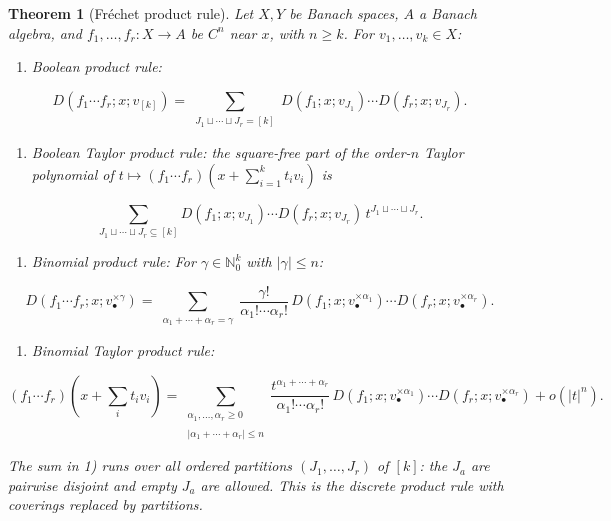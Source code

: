 \documentclass[10pt,a4paper]{article}
\theoremstyle{plain}
\newtheorem{theorem}{Theorem}
\theoremstyle{definition}
\newcommand{\IN}{\mathbb{N}} %
\newcommand{\1}{\mathbb{1}} %
\newcommand{\tightlist}{\setlength{\itemsep}{0pt}\setlength{\parskip}{0pt}}
\begin{document}
\begin{theorem}[Fréchet product rule]

\label{thm:frechet-product-rule} Let \(X, Y\) be Banach spaces, \(A\) a
Banach algebra, and \(f_1, \dots, f_r: X \to A\) be \(C^n\) near \(x\),
with \(n \geq k\). For \(v_1, \dots, v_k \in X\):

\begin{enumerate}
\def\labelenumi{\arabic{enumi})}
\tightlist
\item
  \emph{Boolean product rule:}
\end{enumerate}

\[
  D(f_1 \cdots f_r; x; v_{[k]})
  =
  \sum_{\substack{J_1 \sqcup \cdots \sqcup J_r = [k]}}
  D(f_1; x; v_{J_1}) \cdots D(f_r; x; v_{J_r}).
\]

\begin{enumerate}
\def\labelenumi{\arabic{enumi})}
\setcounter{enumi}{1}
\tightlist
\item
  \emph{Boolean Taylor product rule:} the square-free part of the
  order-\(n\) Taylor polynomial of
  \(t \mapsto (f_1 \cdots f_r)(x + \sum_{i=1}^k t_i v_i)\) is
\end{enumerate}

\[
  \sum_{J_1 \sqcup \cdots \sqcup J_r \subseteq [k]}
  D(f_1; x; v_{J_1}) \cdots D(f_r; x; v_{J_r})\, t^{J_1 \sqcup \cdots \sqcup J_r}.
\]

\begin{enumerate}
\def\labelenumi{\arabic{enumi})}
\setcounter{enumi}{2}
\tightlist
\item
  \emph{Binomial product rule:} For \(\gamma \in \IN_0^k\) with
  \(|\gamma| \leq n\):
\end{enumerate}

\[
  D(f_1 \cdots f_r; x; v_\bullet^{\times \gamma})
  =
  \sum_{\substack{\alpha_1 + \cdots + \alpha_r = \gamma}}
  \frac{\gamma!}{\alpha_1! \cdots \alpha_r!}\,
  D(f_1; x; v_\bullet^{\times \alpha_1}) \cdots D(f_r; x; v_\bullet^{\times \alpha_r}).
\]

\begin{enumerate}
\def\labelenumi{\arabic{enumi})}
\setcounter{enumi}{3}
\tightlist
\item
  \emph{Binomial Taylor product rule:}
\end{enumerate}

\[
  (f_1 \cdots f_r)(x + {\textstyle\sum_i} t_i v_i)
  =
  \sum_{\substack{\alpha_1, \dots, \alpha_r \geq 0 \\\\ |\alpha_1 + \cdots + \alpha_r| \leq n}}
  \frac{t^{\alpha_1 + \cdots + \alpha_r}}{\alpha_1! \cdots \alpha_r!}\,
  D(f_1; x; v_\bullet^{\times \alpha_1}) \cdots D(f_r; x; v_\bullet^{\times \alpha_r}) + o(|t|^n).
\]

The sum in 1) runs over all \emph{ordered partitions}
\((J_1, \dots, J_r)\) of \([k]\): the \(J_a\) are pairwise disjoint and
empty \(J_a\) are allowed. This is the discrete product rule with
coverings replaced by partitions.

\end{theorem}
\end{document}
